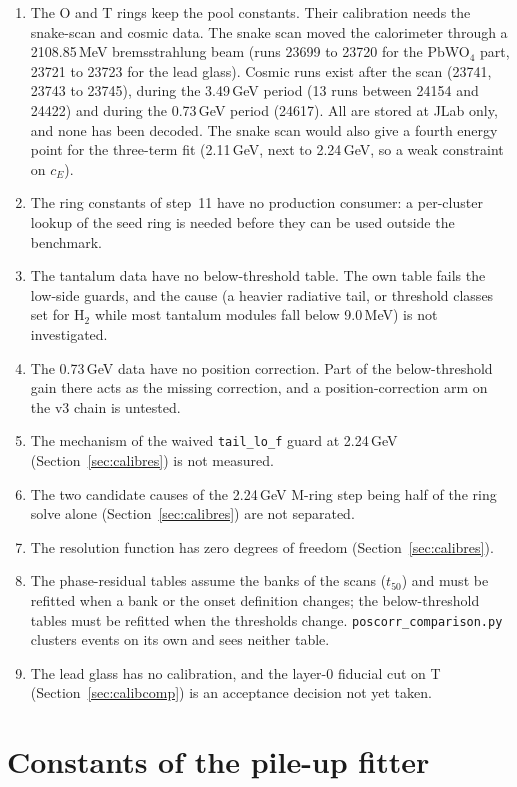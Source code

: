 \documentclass[11pt]{article}
\newcommand{\code}[1]{\texttt{#1}}
\begin{document}
\begin{enumerate}
\item The O and T rings keep the pool constants. Their calibration needs the snake-scan and cosmic data. The snake scan moved the calorimeter through a 2108.85\,MeV bremsstrahlung beam (runs 23699 to 23720 for the PbWO$_4$ part, 23721 to 23723 for the lead glass). Cosmic runs exist after the scan (23741, 23743 to 23745), during the 3.49\,GeV period (13 runs between 24154 and 24422) and during the 0.73\,GeV period (24617). All are stored at JLab only, and none has been decoded. The snake scan would also give a fourth energy point for the three-term fit (2.11\,GeV, next to 2.24\,GeV, so a weak constraint on $c_E$).
\item The ring constants of step~11 have no production consumer: a per-cluster lookup of the seed ring is needed before they can be used outside the benchmark.
\item The tantalum data have no below-threshold table. The own table fails the low-side guards, and the cause (a heavier radiative tail, or threshold classes set for H$_2$ while most tantalum modules fall below 9.0\,MeV) is not investigated.
\item The 0.73\,GeV data have no position correction. Part of the below-threshold gain there acts as the missing correction, and a position-correction arm on the v3 chain is untested.
\item The mechanism of the waived \code{tail\_lo\_f} guard at 2.24\,GeV (Section~\ref{sec:calibres}) is not measured.
\item The two candidate causes of the 2.24\,GeV M-ring step being half of the ring solve alone (Section~\ref{sec:calibres}) are not separated.
\item The resolution function has zero degrees of freedom (Section~\ref{sec:calibres}).
\item The phase-residual tables assume the banks of the scans ($t_{50}$) and must be refitted when a bank or the onset definition changes; the below-threshold tables must be refitted when the thresholds change. \code{poscorr\_comparison.py} clusters events on its own and sees neither table.
\item The lead glass has no calibration, and the layer-0 fiducial cut on T (Section~\ref{sec:calibcomp}) is an acceptance decision not yet taken.
\end{enumerate}

\clearpage
\appendix

\section{Constants of the pile-up fitter}
\label{app:const}
\end{document}
